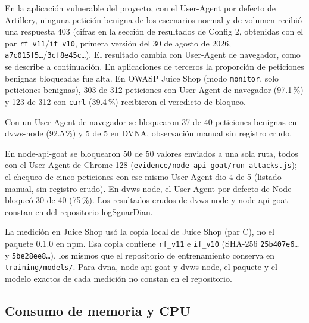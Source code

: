 En la aplicación vulnerable del proyecto, con el User-Agent por defecto de Artillery, ninguna petición benigna de los escenarios normal y de volumen recibió una respuesta 403 (cifras en la sección de resultados de Config 2, obtenidas con el par \texttt{rf\_v11}/\texttt{if\_v10}, primera versión del 30 de agosto de 2026, \texttt{a7c015f5\ldots}/\texttt{3cf8e45c\ldots}). El resultado cambia con User-Agent de navegador, como se describe a continuación. En aplicaciones de terceros la proporción de peticiones benignas bloqueadas fue alta. En OWASP Juice Shop (modo \texttt{monitor}, solo peticiones benignas), 303 de 312 peticiones con User-Agent de navegador (97.1\,\%) y 123 de 312 con \texttt{curl} (39.4\,\%) recibieron el veredicto de bloqueo.

Con un User-Agent de navegador se bloquearon 37 de 40 peticiones benignas en dvws-node (92.5\,\%) y 5 de 5 en DVNA, observación manual sin registro crudo. 

En node-api-goat se bloquearon 50 de 50 valores enviados a una sola ruta, todos con el User-Agent de Chrome 128 (\texttt{evidence/node-api-goat/run-attacks.js}); el chequeo de cinco peticiones con ese mismo User-Agent dio 4 de 5 (listado manual, sin registro crudo). En dvws-node, el User-Agent por defecto de Node bloqueó 30 de 40 (75\,\%). Los resultados crudos de dvws-node y node-api-goat constan en  del repositorio logSguarDian.

La medición en Juice Shop usó la copia local de Juice Shop (par C), no el paquete 0.1.0 en npm. Esa copia contiene \texttt{rf\_v11} e \texttt{if\_v10} (SHA-256 \texttt{25b407e6\ldots} y \texttt{5be28ee8\ldots}), los mismos que el repositorio de entrenamiento conserva en \texttt{training/models/}. Para dvna, node-api-goat y dvws-node, el paquete y el modelo exactos de cada medición no constan en el repositorio.

\subsection{Consumo de memoria y CPU}\label{sec:memoria-cpu}

